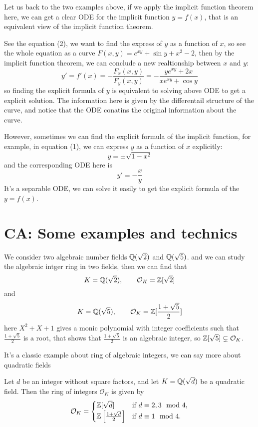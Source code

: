 \documentclass[12pt,a4paper]{article}
\begin{document}
Let us back to the two examples above, if we apply the implicit function theorem here, we can get a clear ODE for the implicit function \(y=f(x)\), that is an equivalent view of the implicit function theorem.
\begin{example}
    See the equation (2), we want to find the express of \(y\) as a function of \(x\), so see the whole equation as a curve \(F(x,y) = e^{xy} + \sin y + x^2 - 2\), then by the implicit function theorem, we can conclude a new realtionship between \(x\) and \(y\):
     \[y' = f'(x) = -\frac{F_x(x,y)}{F_y(x,y)} = -\frac{ye^{xy} + 2x}{xe^{xy} + \cos y}\]
    so finding the explicit formula of \(y\) is equivalent to solving above ODE to get a explicit solution. The information here is given by the differentail structure of the curve, and notice that the ODE conatins the original information about the curve.

    However, sometimes we can find the explicit formula of the implicit function, for example, in equation (1), we can express \(y\) as a function of \(x\) explicitly:
    \[y = \pm \sqrt{1-x^2}\]
    and the corresponding ODE here is \[y' = -\frac{x}{y}\]
    It's a separable ODE, we can solve it easily to get the explicit formula of the \(y=f(x)\).
    
\end{example}

\section{ CA: Some examples and technics}
\begin{example}
    We consider two algebraic number fields \(\mathbb{Q}(\sqrt{2})\) and \(\mathbb{Q}(\sqrt{5})\). and we can study the algebraic intger ring in two fields, then we can find that
    \[K = \mathbb{Q}(\sqrt{2}), \qquad \mathcal{O}_K  = \mathbb{Z}[\sqrt{2}]\]
    and 
    \[K = \mathbb{Q}(\sqrt{5}), \qquad \mathcal{O}_K  = \mathbb{Z}[\frac{1+\sqrt{5}}{2}]\]
    here \(X^2+X+1\) gives a monic polynomial with integer coefficients such that \(\frac{1+\sqrt{5}}{2}\) is a root, that shows that \(\frac{1+\sqrt{5}}{2}\) is an algebraic integer, so \(\mathbb{Z}[\sqrt{5}] \subsetneq \mathcal{O}_K\).
\end{example}

It's a classic example about ring of algebraic integers, we can say more about quadratic fields

\begin{theorem}
    Let \(d\) be an integer without square factors, and let \(K = \mathbb{Q}(\sqrt{d})\) be a quadratic field. Then the ring of integers \(\mathcal{O}_K\) is given by
    \[
    \mathcal{O}_K = 
    \begin{cases}
        \mathbb{Z}[\sqrt{d}] & \text{if } d \equiv 2, 3 \mod 4, \\
        \mathbb{Z}\left[\frac{1 + \sqrt{d}}{2}\right] & \text{if } d \equiv 1 \mod 4.
    \end{cases}
    \]
\end{theorem}
\end{document}
